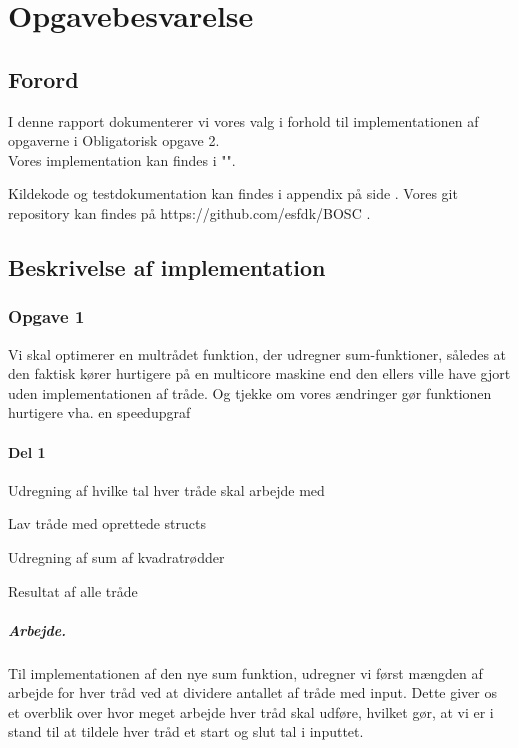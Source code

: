 \chapter{Opgavebesvarelse}
\section{Forord}
I denne rapport dokumenterer vi vores valg i forhold til implementationen af opgaverne i Obligatorisk opgave 2.
\\Vores implementation kan findes i "".

Kildekode og testdokumentation kan findes i appendix på side \pageref{Appendix}. Vores git repository kan findes på https://github.com/esfdk/BOSC .

\section{}

\section{Beskrivelse af implementation}
\subsection{Opgave 1}
\label{O1}
Vi skal optimerer en multrådet funktion, der udregner sum-funktioner, således at den faktisk kører hurtigere på en multicore maskine end den ellers ville have gjort uden implementationen af tråde. Og tjekke om vores ændringer gør funktionen hurtigere vha. en speedupgraf

\subsubsection{Del 1}
\label{O1_1}
\begin{my_itemize}
\item Udregning af hvilke tal hver tråde skal arbejde med
\item Lav tråde med oprettede structs
\item Udregning af sum af kvadratrødder
\item Resultat af alle tråde
\end{my_itemize}
\paragraph{Arbejde.} Til implementationen af den nye sum funktion, udregner vi først mængden af arbejde for hver tråd ved at dividere antallet af tråde med input. Dette giver os et overblik over hvor meget arbejde hver tråd skal udføre, hvilket gør, at vi er i stand til at tildele hver tråd et start og slut tal i inputtet.
